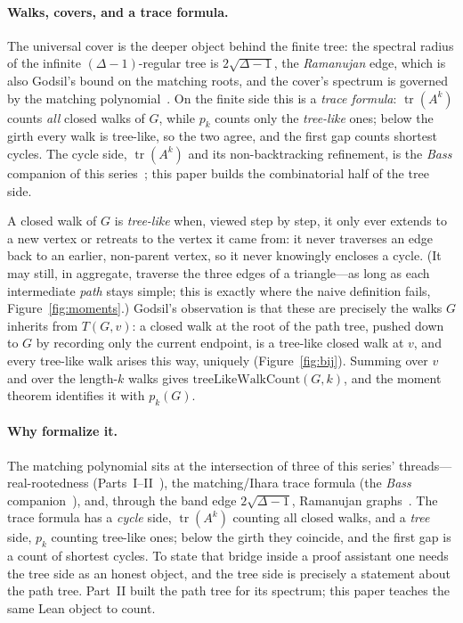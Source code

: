 \documentclass[11pt]{article}
\DeclareMathOperator{\tr}{tr}
\begin{document}
\paragraph{Walks, covers, and a trace formula.} The universal cover is the deeper object behind the
finite tree: the spectral radius of the infinite $(\Delta-1)$-regular tree is $2\sqrt{\Delta-1}$, the
\emph{Ramanujan} edge, which is also Godsil's bound on the matching roots, and the cover's spectrum is
governed by the matching polynomial~\cite{AngelFriedmanHoory,Spier2025}. On the finite side this is a
\emph{trace formula}: $\tr(A^k)$ counts \emph{all} closed walks of $G$, while $p_k$ counts only the
\emph{tree-like} ones; below the girth every walk is tree-like, so the two agree, and the first gap
counts shortest cycles. The cycle side, $\tr(A^k)$ and its non-backtracking refinement, is the
\emph{Bass} companion of this series~\cite{Bass,Hashimoto,IharaBass}; this paper builds the
combinatorial half of the tree side.

A closed walk of $G$ is \emph{tree-like} when, viewed step by step, it only ever extends to a new
vertex or retreats to the vertex it came from: it never traverses an edge back to an earlier,
non-parent vertex, so it never knowingly encloses a cycle. (It may still, in aggregate, traverse the
three edges of a triangle---as long as each intermediate \emph{path} stays simple; this is exactly
where the naive definition fails, Figure~\ref{fig:moments}.) Godsil's observation is that these are
precisely the walks $G$ inherits from $T(G,v)$: a closed walk at the root of the path tree, pushed
down to $G$ by recording only the current endpoint, is a tree-like closed walk at $v$, and every
tree-like walk arises this way, uniquely (Figure~\ref{fig:bij}). Summing over $v$ and over the
length-$k$ walks gives $\mathrm{treeLikeWalkCount}(G,k)$, and the moment theorem identifies it with
$p_k(G)$.

\paragraph{Why formalize it.} The matching polynomial sits at the intersection of three of this
series' threads---real-rootedness (Parts~I--II~\cite{PartI,PartII}), the matching/Ihara trace formula
(the \emph{Bass} companion~\cite{Bass}), and, through the band edge $2\sqrt{\Delta-1}$, Ramanujan
graphs~\cite{MSS}. The trace formula has a \emph{cycle} side, $\tr(A^k)$ counting all closed walks,
and a \emph{tree} side, $p_k$ counting tree-like ones; below the girth they coincide, and the first
gap is a count of shortest cycles. To state that bridge inside a proof assistant one needs the
tree side as an honest object, and the tree side is precisely a statement about the path tree.
Part~II built the path tree for its spectrum; this paper teaches the same Lean object to count.
\end{document}
